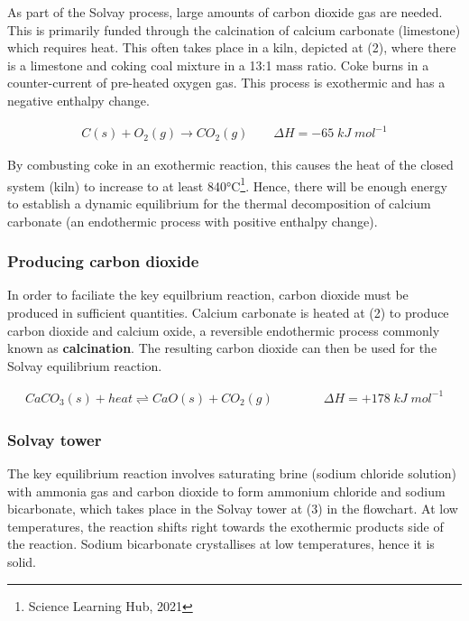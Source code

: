 \documentclass[12pt, a4paper]{article}
\begin{document}
As part of the Solvay process, large amounts of carbon dioxide gas are needed. This is primarily funded through the calcination of calcium carbonate (limestone) which requires heat. This often takes place in a kiln, depicted at (2), where there is a limestone and coking coal mixture in a 13:1 mass ratio. Coke burns in a counter-current of pre-heated oxygen gas. This process is exothermic and has a negative enthalpy change.

\begin{align}
	C(s) + O_{2}(g) \rightarrow CO_{2}(g) \qquad \Delta H = -65 \; kJ \; mol^{-1}
\end{align}

By combusting coke in an exothermic reaction, this causes the heat of the closed system (kiln) to increase to at least 840°C\footnote{Science Learning Hub, 2021}. Hence, there will be enough energy to establish a dynamic equilibrium for the thermal decomposition of calcium carbonate (an endothermic process with positive enthalpy change).


\subsubsection{Producing carbon dioxide}

In order to faciliate the key equilbrium reaction, carbon dioxide must be produced in sufficient quantities. Calcium carbonate is heated at (2) to produce carbon dioxide and calcium oxide, a reversible endothermic process commonly known as \textbf{calcination}. The resulting carbon dioxide can then be used for the Solvay equilibrium reaction.

\begin{align}
	CaCO_{3}(s) + heat \rightleftharpoons CaO(s) + CO_{2}(g) \qquad \qquad \Delta H = +178 \; kJ \; mol^{-1}
\end{align}

\subsubsection{Solvay tower}

The key equilibrium reaction involves saturating brine (sodium chloride solution) with ammonia gas and carbon dioxide to form ammonium chloride and sodium bicarbonate, which takes place in the Solvay tower at (3) in the flowchart. At low temperatures, the reaction shifts right towards the exothermic products side of the reaction. Sodium bicarbonate crystallises at low temperatures, hence it is solid.
\end{document}
